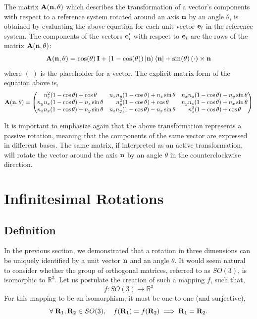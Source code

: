 \documentclass[12pt]{article}
\begin{document}
The matrix $\vb{A}(\vb{n}, \theta)$ which describes the transformation of a vector's
components with respect to a reference system rotated around an axis $\vb{n}$ by an angle
$\theta$, is obtained by evaluating the above equation for each unit vector $\vb{e}_i$ in
the reference system. The components of the vectors $\vb{e}'_i$ with respect to $\vb{e}_i$
are the rows of the matrix $\vb{A}(\vb{n}, \theta)$:
\begin{equation}
  \vb{A}(\vb{n},\theta) = \cos(\theta)\,\vb{I} + (1-\cos(\theta))\ket{\vb{n}}\bra{\vb{n}}
    + \sin(\theta)\,(\cdot) \times \vb{n}
  \label{eq:rotation_matrix}
\end{equation}
where $(\cdot)$ is the placeholder for a vector. The explicit matrix form of the equation
above is,
\begin{equation}
  \vb{A}(\vb{n},\theta) =
  \begin{pmatrix}
    n_x^2(1-\cos\theta)+\cos\theta        & n_x n_y(1-\cos\theta)+n_z\sin\theta   & n_x n_z(1-\cos\theta)-n_y\sin\theta \\
    n_y n_x(1-\cos\theta)-n_z\sin\theta   & n_y^2(1-\cos\theta)+\cos\theta        & n_y n_z(1-\cos\theta)+n_x\sin\theta \\
    n_z n_x(1-\cos\theta)+n_y\sin\theta   & n_z n_y(1-\cos\theta)-n_x\sin\theta   & n_z^2(1-\cos\theta)+\cos\theta
  \end{pmatrix}
\end{equation}

It is important to emphasize again that the above transformation represents a passive
rotation, meaning that the components of the same vector are expressed in different bases.
The same matrix, if interpreted as an active transformation, will rotate the vector around
the axis $\vb{n}$ by an angle $\theta$ in the counterclockwise direction.

\section{Infinitesimal Rotations}

\subsection{Definition}

In the previous section, we demonstrated that a rotation in three dimensions can be uniquely
identified by a unit vector $\vb{n}$ and an angle $\theta$. It would seem natural to consider
whether the group of orthogonal matrices, referred to as $SO(3)$, is isomorphic to
$\mathbb{R}^3$. Let us postulate the creation of such a mapping $f$, such that,
\begin{equation}
  f: SO(3) \to \mathbb{R}^3
\end{equation}
For this mapping to be an isomorphism, it must be one-to-one (and surjective),
\begin{equation}
  \forall\; \vb{R}_1, \vb{R}_2 \in SO(3),\quad
  f(\vb{R}_1) = f(\vb{R}_2) \implies \vb{R}_1 = \vb{R}_2.
\end{equation}
\end{document}
